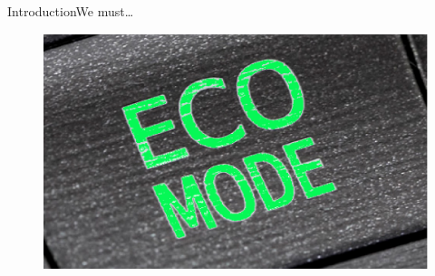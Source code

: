 %
%
%
%
%
%
%
%
%
%
%
%



    \begin{frame}{Introduction}{We must\ldots}




  
%
%
%

        \begin{figure}[h]

            \centering

            \includegraphics[width=.75\textwidth]{images/ecomode} 

            \label{fig:ecomode}


        \end{figure}


    \end{frame}


